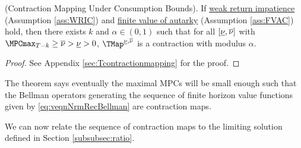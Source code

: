 \documentclass[BufferStockTheory]{subfiles}
\begin{document}
\begin{theorem}(Contraction Mapping Under Consumption Bounds).
\label{thm:cmap}
If \hyperlink{WRIC}{weak return impatience} (Assumption \ref{ass:WRIC})  and  \hyperlink{FVAC}{finite value of autarky} (Assumption \ref{ass:FVAC}) hold, then there exists $k$ and $\alpha\in (0,1)$ such that for all $[\underline{\nu}, \overline{\nu}]$ with $\MPCmax_{T-k}\geq \MPCmaxInf> \MPCminInf>0$, $\TMap^{\MPCminInf, \MPCmaxInf}$ is a contraction with modulus $\alpha$.
\end{theorem}
\begin{proof}
See Appendix \ref{sec:Tcontractionmapping} for the proof.

\end{proof}

The theorem says eventually the maximal MPCs will be small enough such that the Bellman operators generating the sequence of finite horizon value functions given by \eqref{eq:veqnNrmRecBellman} are contraction maps.

We can now relate the sequence of contraction maps to the limiting solution defined in Section \ref{subsubsec:ratio}.
\end{document}
